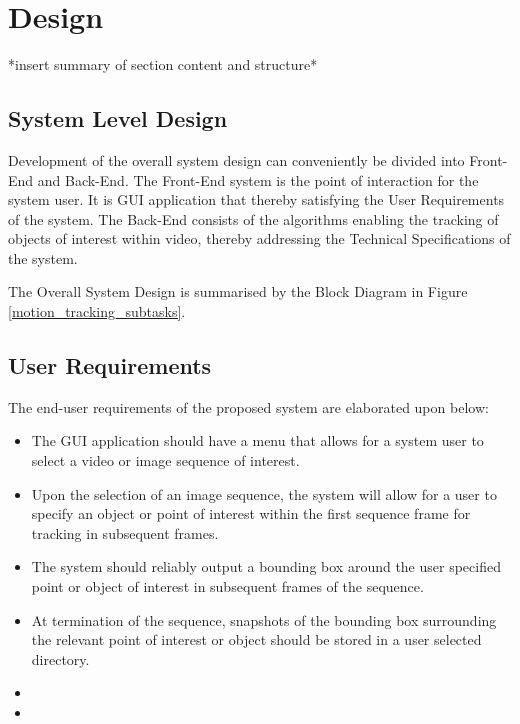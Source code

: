 \chapter{Design}\label{design}
*insert summary of section content and structure*

\section{System Level Design}
Development of the overall system design can conveniently be divided into
Front-End and Back-End. The Front-End system is the point of interaction for the
system user. It is GUI application that thereby satisfying the User Requirements
of the system. The Back-End consists of the algorithms enabling the tracking of
objects of interest within video, thereby addressing the Technical
Specifications of the system.

The Overall System Design is summarised by the Block Diagram in Figure
\ref{motion_tracking_subtasks}.


\section{User Requirements}
The end-user requirements of the proposed system are elaborated upon below:
\begin{itemize}
    \item The GUI application should have a menu that allows for a system
        user to select a video or image sequence of interest.
    \item Upon the selection of an image sequence, the system will allow for a
        user to specify an object or point of interest within the first sequence
        frame for tracking in subsequent frames.
    \item The system should reliably output a bounding box around the user
        specified point or object of interest in subsequent frames of the
        sequence. 
    \item At termination of the sequence, snapshots of the bounding box
        surrounding the relevant point of interest or object should be stored in
        a user selected directory.
    \item
    \item 
\end{itemize}

